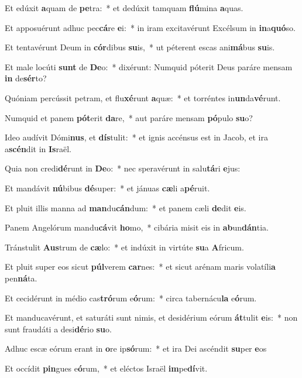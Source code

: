 \item Et edúxit \textbf{a}quam de \textbf{pe}tra:~* et dedúxit tamquam \textbf{flú}mina \textbf{a}quas.
\item Et apposuérunt adhuc pec\textbf{cá}re \textbf{e}i:~* in iram excitavérunt Excélsum in \textbf{in}a\textbf{quó}so.
\item Et tentavérunt Deum in \textbf{cór}dibus \textbf{su}is,~* ut péterent escas ani\textbf{má}bus \textbf{su}is.
\item Et male locúti \textbf{sunt} de \textbf{De}o:~* dixérunt: Numquid póterit Deus paráre mensam \textbf{in} de\textbf{sér}to?
\item Quóniam percússit petram, et flu\textbf{xé}runt \textbf{a}quæ:~* et torréntes in\textbf{un}da\textbf{vé}runt.
\item Numquid et panem \textbf{pót}erit \textbf{da}re,~* aut paráre mensam \textbf{pó}pulo \textbf{su}o?
\item Ideo audívit Dómi\textbf{nus}, et \textbf{dís}tulit:~* et ignis accénsus est in Jacob, et ira a\textbf{scén}dit in \textbf{Is}raël.
\item Quia non credi\textbf{dé}runt in \textbf{De}o:~* nec speravérunt in salu\textbf{tá}ri \textbf{e}jus:
\item Et mandávit \textbf{nú}bibus \textbf{dé}super:~* et jánuas \textbf{cæ}li a\textbf{pé}ruit.
\item Et pluit illis manna ad \textbf{man}du\textbf{cán}dum:~* et panem cæli \textbf{de}dit \textbf{e}is.
\item Panem Angelórum mandu\textbf{cá}vit \textbf{ho}mo,~* cibária misit eis in \textbf{ab}un\textbf{dán}tia.
\item Tránstulit \textbf{Aus}trum de \textbf{cæ}lo:~* et indúxit in virtúte \textbf{su}a \textbf{A}fricum.
\item Et pluit super eos sicut \textbf{púl}verem \textbf{car}nes:~* et sicut arénam maris volatíli\textbf{a} pen\textbf{ná}ta.
\item Et cecidérunt in médio cas\textbf{tró}rum e\textbf{ó}rum:~* circa tabernácu\textbf{la} e\textbf{ó}rum.
\item Et manducavérunt, et saturáti sunt nimis, et desidérium eórum \textbf{át}tulit \textbf{e}is:~* non sunt fraudáti a desi\textbf{dé}rio \textbf{su}o.
\item Adhuc escæ eórum erant in \textbf{o}re ip\textbf{só}rum:~* et ira Dei ascéndit \textbf{su}per \textbf{e}os
\item Et occídit \textbf{pin}gues e\textbf{ó}rum,~* et eléctos Israël \textbf{im}pe\textbf{dí}vit.
